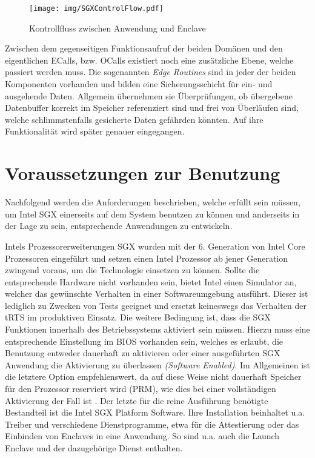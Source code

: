 \begin{figure}[h]
	\texttt{[image: img/SGXControlFlow.pdf]}
	\centering
	\caption{Kontrollfluss zwischen Anwendung und Enclave}
	\label{fig:sgxcontrolflow}
\end{figure}

Zwischen dem gegenseitigen Funktionsaufruf der beiden Domänen und den eigentlichen \acp{ECall}, bzw. \acp{OCall} existiert noch eine zusätzliche Ebene, welche passiert werden muss. Die sogenannten \textit{Edge Routines} sind in jeder der beiden Komponenten vorhanden und bilden eine Sicherungsschicht für ein- und ausgehende Daten. Allgemein übernehmen sie Überprüfungen, ob übergebene Datenbuffer korrekt im Speicher referenziert sind und frei von Überläufen sind, welche schlimmstenfalls gesicherte Daten gefährden könnten. Auf ihre Funktionalität wird später genauer eingegangen.

\section{Voraussetzungen zur Benutzung}

Nachfolgend werden die Anforderungen beschrieben, welche erfüllt sein müssen, um Intel \ac{SGX} einerseits auf dem System benutzen zu können und anderseits in der Lage zu sein, entsprechende Anwendungen zu entwickeln.

Intels Prozessorerweiterungen \ac{SGX} wurden mit der 6. Generation von Intel Core Prozessoren eingeführt und setzen einen Intel Prozessor ab jener Generation zwingend voraus, um die Technologie einsetzen zu können. Sollte die entsprechende Hardware nicht vorhanden sein, bietet Intel einen Simulator an, welcher das gewünschte Verhalten in einer Softwareumgebung ausführt. Dieser ist lediglich zu Zwecken von Tests geeignet und ersetzt keineswegs das Verhalten der \ac{tRTS} im produktiven Einsatz. Die weitere Bedingung ist, dass die \ac{SGX} Funktionen innerhalb des Betriebssystems aktiviert sein müssen. Hierzu muss eine entsprechende Einstellung im \ac{BIOS} vorhanden sein, welches es erlaubt, die Benutzung entweder dauerhaft zu aktivieren oder einer ausgeführten \ac{SGX} Anwendung die Aktivierung zu überlassen \textit{(Software Enabled)}. Im Allgemeinen ist die letztere Option empfehlenswert, da auf diese Weise nicht dauerhaft Speicher für den Prozessor reserviert wird (\ac{PRM}), wie dies bei einer vollständigen Aktivierung der Fall ist \cite{SGXDetection}. Der letzte für die reine Ausführung benötigte Bestandteil ist die Intel \ac{SGX} Platform Software. Ihre Installation beinhaltet u.a. Treiber und verschiedene Dienstprogramme, etwa für die Attestierung oder das Einbinden von Enclaves in eine Anwendung. So sind u.a. auch die Launch Enclave und der dazugehörige Dienst enthalten.

